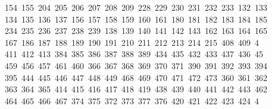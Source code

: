 \begin{tabbing}
\ 154\ 155\ 204\ 205\ 206\ 207\ 208\ 209\ 228\ 229\ 230\ 231\ 232\ 233\ 132\ 133\\[0pt]
\>\ 134\ 135\ 136\ 137\ 156\ 157\ 158\ 159\ 160\ 161\ 180\ 181\ 182\ 183\ 184\ 185\\[0pt]
\>\ 234\ 235\ 236\ 237\ 238\ 239\ 138\ 139\ 140\ 141\ 142\ 143\ 162\ 163\ 164\ 165\ \\[0pt]
\ 167\ 186\ 187\ 188\ 189\ 190\ 191\ 210\ 211\ 212\ 213\ 214\ 215\ 408\ 409\ 4\\[0pt]
\ 411\ 412\ 413\ 384\ 385\ 386\ 387\ 388\ 389\ 434\ 435\ 432\ 433\ 437\ 436\ 45\\[0pt]
\ 459\ 456\ 457\ 461\ 460\ 366\ 367\ 368\ 369\ 370\ 371\ 390\ 391\ 392\ 393\ 394\\[0pt]
\>\ 395\ 444\ 445\ 446\ 447\ 448\ 449\ 468\ 469\ 470\ 471\ 472\ 473\ 360\ 361\ 362\\[0pt]
\>\ 363\ 364\ 365\ 414\ 415\ 416\ 417\ 418\ 419\ 438\ 439\ 440\ 441\ 442\ 443\ 462\ \\[0pt]
\ 464\ 465\ 466\ 467\ 374\ 375\ 372\ 373\ 377\ 376\ 420\ 421\ 422\ 423\ 424\ 4\\[0pt]

\end{tabbing}
